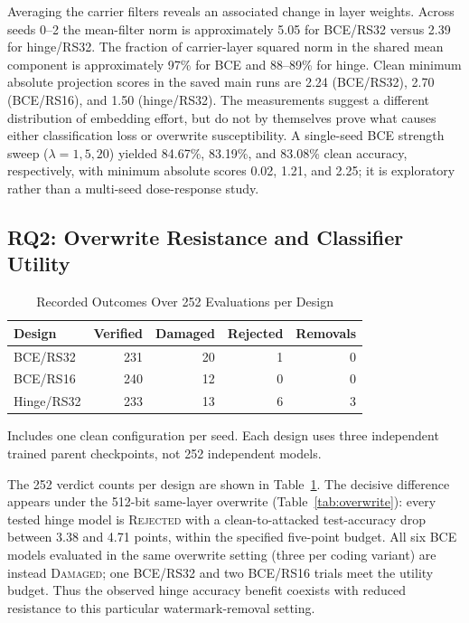 \documentclass[conference]{IEEEtran}
\begin{document}
Averaging the carrier filters reveals an associated change in layer weights.
Across seeds 0--2 the mean-filter norm is approximately 5.05 for BCE/RS32
versus 2.39 for hinge/RS32. The fraction of carrier-layer squared norm in
the shared mean component is approximately 97\% for BCE and 88--89\% for
hinge. Clean minimum absolute projection scores in the saved main runs are
2.24 (BCE/RS32), 2.70 (BCE/RS16), and 1.50 (hinge/RS32). The measurements
suggest a different distribution of embedding effort, but do not by
themselves prove what causes either classification loss or overwrite
susceptibility. A single-seed BCE strength sweep ($\lambda=1,5,20$) yielded
84.67\%, 83.19\%, and 83.08\% clean accuracy, respectively, with minimum
absolute scores 0.02, 1.21, and 2.25; it is exploratory rather than a
multi-seed dose-response study.

\subsection{RQ2: Overwrite Resistance and Classifier Utility}
\begin{table}[!t]
\centering\caption{Recorded Outcomes Over 252 Evaluations per Design}
\label{tab:verdicts}\footnotesize\setlength{\tabcolsep}{3.3pt}
\begin{tabular}{@{}lrrrr@{}}
\toprule
Design & Verified & Damaged & Rejected & Removals\\
\midrule
BCE/RS32 & 231 & 20 & 1 & 0\\
BCE/RS16 & 240 & 12 & 0 & 0\\
Hinge/RS32 & 233 & 13 & 6 & 3\\
\bottomrule
\end{tabular}
\vspace{2pt}
\parbox{0.96\columnwidth}{\scriptsize Includes one clean configuration per seed. Each design uses three independent trained parent checkpoints, not 252 independent models.}
\end{table}

The 252 verdict counts per design are shown in Table~\ref{tab:verdicts}.
The decisive difference appears under the 512-bit same-layer overwrite
(Table~\ref{tab:overwrite}): every tested hinge model is \textsc{Rejected}
with a clean-to-attacked test-accuracy drop between 3.38 and 4.71 points,
within the specified five-point budget. All six BCE models evaluated in the
same overwrite setting (three per coding variant) are instead
\textsc{Damaged}; one BCE/RS32 and two BCE/RS16 trials meet the utility
budget. Thus the observed hinge accuracy benefit coexists with reduced
resistance to this particular watermark-removal setting.
\end{document}
